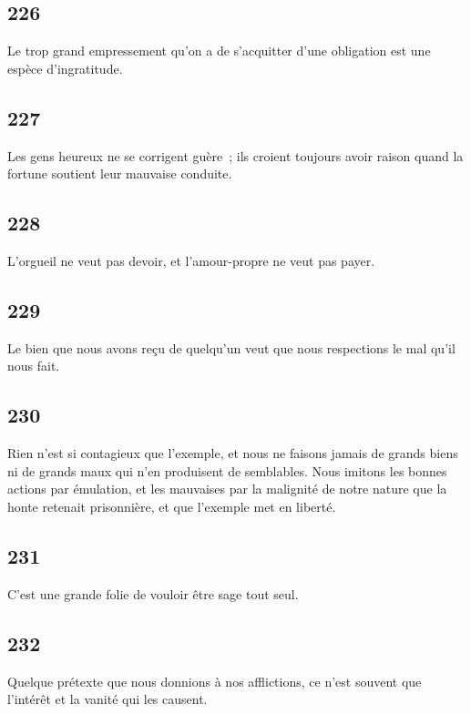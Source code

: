 \documentclass[french,twoside]{book} %
\begin{document}
\subsection[{226}]{ \textsc{226} }
\noindent Le trop grand empressement qu’on a de s’acquitter d’une obligation est une espèce d’ingratitude.
\subsection[{227}]{ \textsc{227} }
\noindent Les gens heureux ne se corrigent guère ; ils croient toujours avoir raison quand la fortune soutient leur mauvaise conduite.
\subsection[{228}]{ \textsc{228} }
\noindent L’orgueil ne veut pas devoir, et l’amour-propre ne veut pas payer.
\subsection[{229}]{ \textsc{229} }
\noindent Le bien que nous avons reçu de quelqu’un veut que nous respections le mal qu’il nous fait.
\subsection[{230}]{ \textsc{230} }
\noindent Rien n’est si contagieux que l’exemple, et nous ne faisons jamais de grands biens ni de grands maux qui n’en produisent de semblables. Nous imitons les bonnes actions par émulation, et les mauvaises par la malignité de notre nature que la honte retenait prisonnière, et que l’exemple met en liberté.
\subsection[{231}]{ \textsc{231} }
\noindent C’est une grande folie de vouloir être sage tout seul.
\subsection[{232}]{ \textsc{232} }
\noindent Quelque prétexte que nous donnions à nos afflictions, ce n’est souvent que l’intérêt et la vanité qui les causent.
\end{document}
